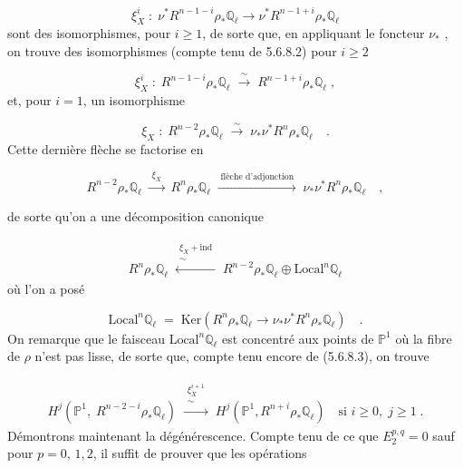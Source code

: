 \begin{equation*}
\xi_X^i \; : \; \nu^* R^{n-1-i}\rho_* \mathbb{Q}_\ell \longrightarrow \nu^* R^{n-1+i}\rho_* \mathbb{Q}_\ell
\end{equation*}
sont des isomorphismes, pour $i \geq 1$, de sorte que, en appliquant le foncteur $\nu_*$ , on trouve des isomorphismes (compte tenu de 5.6.8.2) pour $i \geq 2$

\begin{equation}\tag{5.6.8.3}
\xi_X^i \; : \; R^{n-1-i}\rho_* \mathbb{Q}_\ell \; \xrightarrow{\;\sim\;} \; R^{n-1+i}\rho_* \mathbb{Q}_\ell \; ,
\end{equation}
et, pour $i = 1$, un isomorphisme

\begin{equation}\tag{5.6.8.4}
\xi_X \; : \; R^{n-2}\rho_* \mathbb{Q}_\ell \; \xrightarrow{\;\sim\;} \; \nu_* \nu^* R^n \rho_* \mathbb{Q}_\ell \quad .
\end{equation}
Cette dernière flèche se factorise en

\begin{equation}\tag{5.6.8.5}
R^{n-2}\rho_* \mathbb{Q}_\ell \; \xrightarrow{\;\xi_X\;} \; R^n \rho_* \mathbb{Q}_\ell \; \xrightarrow{\;\text{flèche d'adjonction}\;} \; \nu_* \nu^* R^n \rho_* \mathbb{Q}_\ell \quad , 
\end{equation}


 de sorte qu'on a une décomposition canonique

\begin{multline}\tag{5.6.8.6}
R^n \rho_* \mathbb{Q}_\ell \; \xleftarrow{\substack{\xi_X + \mathrm{ind} \\ \sim}} \; R^{n-2}\rho_* \mathbb{Q}_\ell \oplus \mathrm{Local}^n \mathbb{Q}_\ell
\end{multline}
où l'on a posé

\begin{equation}\tag{5.6.8.7}
\mathrm{Local}^n \mathbb{Q}_\ell \; = \; \mathrm{Ker}(R^n \rho_* \mathbb{Q}_\ell \longrightarrow \nu_* \nu^* R^n \rho_* \mathbb{Q}_\ell) \quad .
\end{equation}
On remarque que le faisceau $\mathrm{Local}^n \mathbb{Q}_\ell$ est concentré aux points de $\mathbb{P}^1$ où la fibre de $\rho$ n'est pas lisse, de sorte que, compte tenu encore de (5.6.8.3), on trouve

\begin{multline}\tag{5.6.8.8}
H^j(\mathbb{P}^1, \; R^{n-2-i}\rho_* \mathbb{Q}_\ell) \; \xrightarrow{\substack{\xi_X^{i+1} \\ \sim}} \; H^j(\mathbb{P}^1,R^{n+i}\rho_*\mathbb{Q}_\ell) \quad \text{si } i \geq 0,\; j \geq 1 \; .
\end{multline}
Démontrons maintenant la dégénérescence. Compte tenu de ce que $E_2^{p,q} = 0$ sauf pour $p = 0$, $1,2$, il suffit de prouver que les opérations

